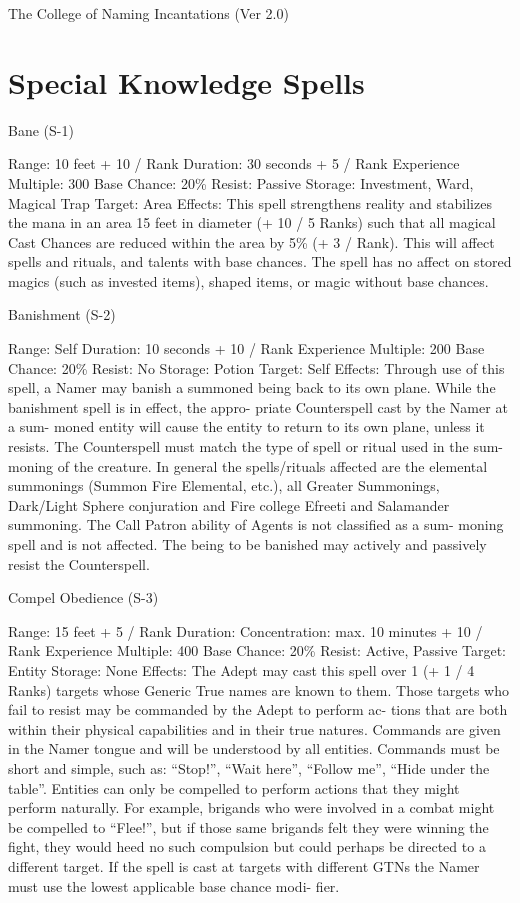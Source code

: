 \begin{Chapter}{The College of Naming Incantations (Ver 2.0)}
\section{Special Knowledge Spells}

Bane (S-1) 

Range: 10 feet + 10 / Rank 
Duration: 30 seconds + 5 / Rank 
Experience Multiple: 300 
Base Chance: 20\% 
Resist: Passive 
Storage: Investment, Ward, Magical Trap 
Target: Area 
Effects: This spell strengthens reality and stabilizes 
the  mana  in  an  area  15  feet  in  diameter  (+  10  /  5 
Ranks)  such  that  all  magical  Cast  Chances  are 
reduced  within  the  area  by  5\%  (+  3  /  Rank).  This 
will  affect  spells  and  rituals, and  talents  with  base 
chances.  The  spell  has  no  affect  on  stored  magics 
(such  as  invested  items),  shaped  items,  or  magic 
without base chances. 

Banishment (S-2) 

Range: Self 
Duration: 10 seconds + 10 / Rank 
Experience Multiple: 200 
Base Chance: 20\% 
Resist: No 
Storage: Potion 
Target: Self 
Effects:  Through  use  of  this  spell,  a  Namer  may 
banish  a  summoned  being  back  to  its  own  plane. 
While  the  banishment  spell  is in  effect,  the  appro-
priate  Counterspell  cast  by  the  Namer  at  a  sum-
moned  entity  will  cause  the  entity  to  return  to  its 
own plane, unless it resists. The Counterspell must 
match  the  type  of  spell  or  ritual  used  in  the  sum-
moning of the creature. In general the spells/rituals 
affected  are  the  elemental  summonings  (Summon 
Fire  Elemental,  etc.),  all  Greater  Summonings, 
Dark/Light  Sphere  conjuration  and  Fire  college 
Efreeti  and  Salamander  summoning.  The  Call 
Patron ability of Agents is not classified as a sum-
moning  spell  and  is  not  affected.  The  being  to  be 
banished  may  actively  and  passively  resist  the 
Counterspell. 

Compel Obedience (S-3) 

Range: 15 feet + 5 / Rank 
Duration:  Concentration:  max.  10  minutes  +  10  / 
Rank 
Experience Multiple: 400 
Base Chance: 20\% 
Resist: Active, Passive 
Target: Entity 
Storage: None 
Effects: The Adept may cast this spell over 1 (+ 1 / 
4  Ranks)  targets  whose  Generic  True  names  are 
known  to  them.  Those  targets  who  fail  to  resist 
may  be  commanded  by  the  Adept  to  perform  ac-
tions that are both within their physical capabilities 
and  in  their  true  natures.  Commands  are  given  in 
the  Namer  tongue  and  will  be  understood  by  all 
entities. Commands must be short and simple, such 
as:  “Stop!”,  “Wait  here”,  “Follow  me”,  “Hide 
under the table”. Entities can only be compelled to 
perform actions that  they  might  perform naturally. 
For  example,  brigands  who  were  involved  in  a 
combat might be compelled to “Flee!”, but if those 
same  brigands  felt  they  were  winning  the  fight, 
they  would  heed  no  such  compulsion  but  could 
perhaps be directed to a different target. If the spell 
is  cast  at  targets  with  different  GTNs  the  Namer 
must  use  the  lowest  applicable  base  chance  modi-
fier. 


\end{Chapter}
